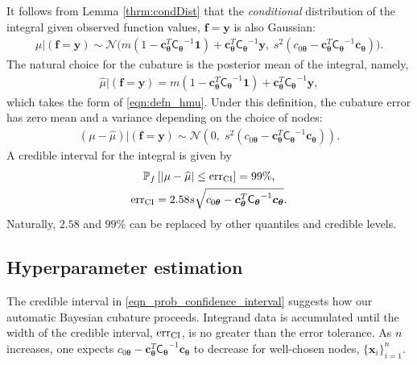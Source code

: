 \documentclass{svjour3}                     %
\newcommand{\bm}[1]{\boldsymbol{#1}}
\newcommand{\vtheta}{{\bm{\theta}}}
\newcommand{\vc}{\bm{c}}
\newcommand{\vf}{\bm{f}}
\newcommand{\vx}{\bm{x}}
\newcommand{\vy}{\bm{y}}
\newcommand{\vone}{\bm{1}}
\newcommand{\mCtheta}{{\mathsf{C}_{\vtheta}}}
\newcommand{\calN}{\mathcal{N}}
\newcommand{\hmu}{\widehat{\mu}}
\newcommand{\err}{\textup{err}}
\begin{document}
It follows from Lemma \ref{thrm:condDist} that the \emph{conditional} distribution of the integral given observed function values, $\vf = \vy$ is also Gaussian:
\begin{align} \label{eqn:condInteg}
\mu | (\vf = \vy) \sim \calN \bigl(m (1 - \vc_\vtheta^T \mCtheta^{-1} \vone)  + \vc_\vtheta^T \mCtheta^{-1} \vy, 
\;
s^2(c_{0\vtheta}  -\vc_\vtheta ^T \mCtheta^{-1} \vc_\vtheta) \bigr).
\end{align}
The natural choice for  the cubature is the posterior mean of the integral, namely, 
\begin{align}
\label{eqn:BayesCub}
\widehat{\mu}  \vert ( \vf = \vy)
= m(1 - \vc_\vtheta^T  \mCtheta^{-1} \vone)
+ \vc_\vtheta^T \mCtheta^{-1} \vy,
\end{align}
which takes the form of \eqref{eqn:defn_hmu}.
Under this definition, the cubature error has zero mean and a variance depending on the choice of nodes:
\begin{align*}
(\mu-\hmu) | (\vf = \vy)
 \sim  \calN 
\left(
0, \;
s^2 (c_{0\vtheta} - \vc_\vtheta^T\mCtheta^{-1}\vc_\vtheta) 
\right).
\end{align*}
A credible interval for the integral is given by 
\begin{subequations} \label{eqn_prob_confidence_interval}
\begin{gather}
\mathbb{P}_f \left[
|\mu-\hmu| \leq \err_{\textup{CI}}
\right] = 99\%, \\
\err_{\textup{CI}} = 2.58 s \sqrt{c_{0\vtheta} - \vc_\vtheta^T\mCtheta^{-1}\vc_\vtheta}.
\end{gather}
\end{subequations}
Naturally, $2.58$ and $99\%$ can be replaced by other quantiles and credible levels.

\subsection{Hyperparameter estimation}
The credible interval in \eqref{eqn_prob_confidence_interval} suggests how our automatic Bayesian cubature proceeds.  Integrand data is accumulated until the width of the credible interval, $\err_{\textup{CI}}$, is no greater than the error tolerance.  As $n$ increases, one expects $c_{0\vtheta} - \vc_\vtheta^T\mCtheta^{-1}\vc_\vtheta$ to decrease for well-chosen nodes, $\{\vx_i\}_{i=1}^n$.
\end{document}
